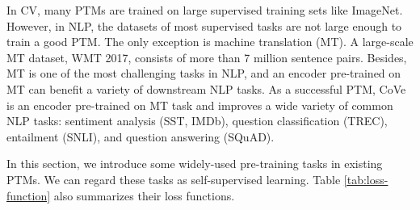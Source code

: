 \documentclass[fleqn]{SCYE-arxiv}
\begin{document}
\begin{multicols}{2}
In CV, many PTMs are trained on large supervised training sets like ImageNet.
However, in NLP, the datasets of most supervised tasks are not large enough to train a good PTM. The only exception is machine translation (MT). A large-scale MT dataset, WMT 2017, consists of more than 7 million sentence pairs.
Besides, MT is one of the most challenging tasks in NLP, and an encoder pre-trained on MT can benefit a variety of downstream NLP tasks.
As a successful PTM, CoVe \cite{mccan2017learn} is an encoder pre-trained on MT task and improves a wide variety of common NLP tasks: sentiment analysis (SST, IMDb), question classification (TREC), entailment (SNLI), and question answering (SQuAD).

In this section, we introduce some widely-used pre-training tasks in existing PTMs. We can regard these tasks as self-supervised learning.
Table \ref{tab:loss-function} also summarizes their  loss functions.




\end{multicols}
\end{document}
